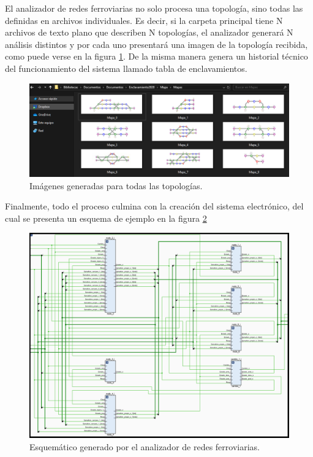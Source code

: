 		El analizador de redes ferroviarias no solo procesa una topología, sino todas las definidas en archivos individuales. Es decir, si la carpeta principal tiene N archivos de texto plano que describen N topologías, el analizador generará N análisis distintos y por cada uno presentará una imagen de la topología recibida, como puede verse en la figura \ref{fig:Topologias}. De la misma manera genera un historial técnico del funcionamiento del sistema llamado tabla de enclavamientos.
		
		\begin{figure}[htbp!]
			\centering
			\includegraphics[scale=.5]{./Figures/Topologias}
			\caption{Imágenes generadas para todas las topologías.}
			\label{fig:Topologias}
		\end{figure}
		
		Finalmente, todo el proceso culmina con la creación del	sistema electrónico, del cual se presenta un esquema de ejemplo en la figura \ref{fig:Esquematico}
		
		\begin{figure}[htbp!]
			\centering
			\includegraphics[scale=.45]{./Figures/Esquematico}
			\caption{Esquemático generado por el analizador de redes ferroviarias.}
			\label{fig:Esquematico}
		\end{figure}
		
